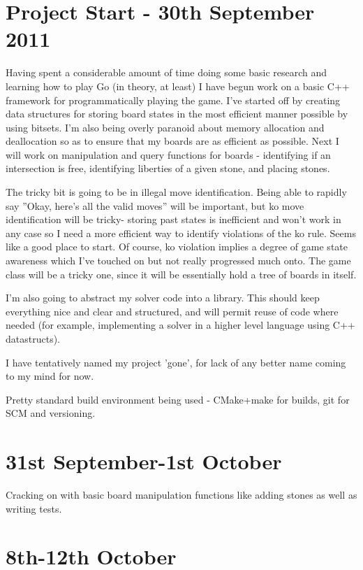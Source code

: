 \documentclass[a4paper,12pt]{article}
\begin{document}
\section*{Project Start - 30th September 2011}

Having spent a considerable amount of time doing some basic research and learning how to play Go (in theory, at least) I have begun work on a basic C++ framework for programmatically playing the game. I've started off by creating data structures for storing board states in the most efficient manner possible by using bitsets. I'm also being overly paranoid about memory allocation and deallocation so as to ensure that my boards are as efficient as possible. Next I will work on manipulation and query functions for boards - identifying if an intersection is free, identifying liberties of a given stone, and placing stones.

The tricky bit is going to be in illegal move identification. Being able to rapidly say ''Okay, here's all the valid moves'' will be important, but ko move identification will be tricky- storing past states is inefficient and won't work in any case so I need a more efficient way to identify violations of the ko rule. Seems like a good place to start. Of course, ko violation implies a degree of game state awareness which I've touched on but not really progressed much onto. The game class will be a tricky one, since it will be essentially hold a tree of boards in itself.

I'm also going to abstract my solver code into a library. This should keep everything nice and clear and structured, and will permit reuse of code where needed (for example, implementing a solver in a higher level language using C++ datastructs).

I have tentatively named my project 'gone', for lack of any better name coming to my mind for now.

Pretty standard build environment being used - CMake+make for builds, git for SCM and versioning.

\section*{31st September-1st October}

Cracking on with basic board manipulation functions like adding stones as well as writing tests.


\section*{8th-12th October}
\end{document}
